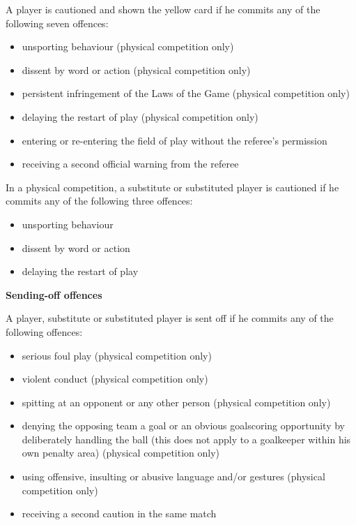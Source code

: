 \headlinebox

A player is cautioned and shown the yellow card if he commits any of the following seven offences:

\begin{itemize}
\item unsporting behaviour (physical competition only)
\item dissent by word or action (physical competition only)
\item persistent infringement of the Laws of the Game (physical competition only)
\item delaying the restart of play (physical competition only)
\item entering or re-entering the field of play without the referee's permission
\item receiving a second official warning from the referee
\end{itemize}

\bigskip

In a physical competition, a substitute or substituted player is cautioned if he commits any of the following three offences:

\begin{itemize}
\item unsporting behaviour
\item dissent by word or action
\item delaying the restart of play
\end{itemize}



{\bfseries Sending-off offences}

\headlinebox

A player, substitute or substituted player is sent off if he commits any of the following offences:

\begin{itemize}
\item serious foul play (physical competition only)
\item violent conduct (physical competition only)
\item spitting at an opponent or any other person (physical competition only)
\item denying the opposing team a goal or an obvious goalscoring opportunity by deliberately handling the ball (this does not apply to a goalkeeper within his own penalty area) (physical competition only)
\item using offensive, insulting or abusive language and/or gestures (physical competition only)
\item receiving a second caution in the same match
\end{itemize}

